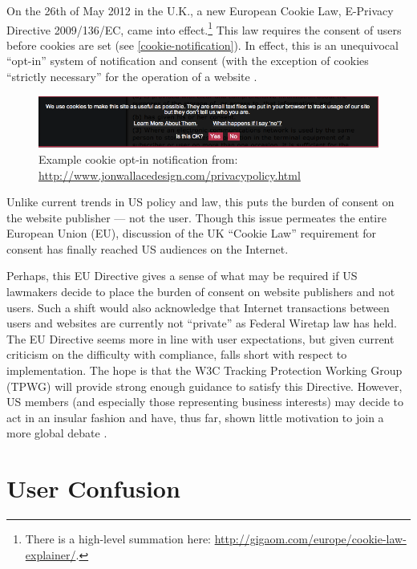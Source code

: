 On the 26th of May 2012 in the U.K., a new European Cookie Law, E-Privacy Directive 2009\slash 136\slash EC, came into effect.\footnote{There is a high-level summation here:  \url{http://gigaom.com/europe/cookie-law-explainer/}. } This law requires the consent of users before cookies are set (see  \autoref{cookie-notification}).  In effect, this is an unequivocal ``opt-in'' system of notification and consent (with the exception of cookies ``strictly necessary'' for the operation of a website  \citep{Anonymous:2009uu}.  


\begin{figure}
\centerline{
\includegraphics[scale=0.70]{chapter2.tex/Image7}
}
\caption{Example cookie opt-in notification from: \url{http://www.jonwallacedesign.com/privacypolicy.html}}
\label{cookie-notification}
\end{figure}


Unlike current trends in US policy and law, this puts the burden of consent on the website publisher --- not the user. Though this issue permeates the entire European Union (EU), discussion of the UK ``Cookie Law'' requirement for consent has finally reached US audiences on the Internet. 

Perhaps, this EU Directive gives a sense of what may be required if US lawmakers decide to place the burden of consent on website publishers and not users. Such a shift would also acknowledge that Internet transactions between users and websites are currently not ``private'' as Federal Wiretap law has held. The EU Directive seems more in line with user expectations, but given current criticism on the difficulty with compliance, falls short with respect to implementation. The hope is that the W3C Tracking Protection Working Group (TPWG) will provide strong enough guidance to satisfy this Directive. However, US members (and especially those representing business interests) may decide to act in an insular fashion and have, thus far, shown little motivation to join a more global debate  \citep{WCpublictracking:mGxHNO_D}.  

\section{User Confusion}
\label{userconfusion}

